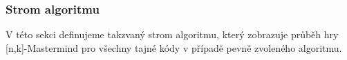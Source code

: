 







 




\subsubsection{Strom algoritmu}
V této sekci definujeme takzvaný strom algoritmu, který zobrazuje průběh hry [n,k]-Mastermind pro všechny tajné kódy v případě pevně zvoleného algoritmu. 


